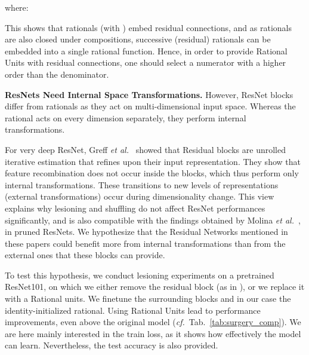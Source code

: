 \documentclass{article}
\newcommand{\cf}{\emph{cf.}~}
\newcommand{\etal}{\emph{et al.}~}
\begin{document}
where: 

This shows that rationals (with ) embed residual connections, and as rationals are also closed under compositions, successive (residual) rationals can be embedded into a single rational function. Hence, in order to provide Rational Units with residual connections,
one should select a numerator with a higher order than the denominator.

\textbf{ResNets Need Internal Space Transformations.}
However, ResNet blocks differ from rationals as they act on multi-dimensional input space. Whereas the rational acts on every dimension separately, they perform internal transformations. 

For very deep ResNet, Greff \etal{} showed that Residual blocks are unrolled iterative estimation that refines upon their input representation. They show that feature recombination does not occur inside the blocks, which thus perform only internal transformations. These transitions to new levels of representations (external transformations) occur during dimensionality change. This view explains why lesioning and shuffling do not affect ResNet performances significantly, and is also compatible with the findings obtained by Molina \etal{}, in pruned ResNets. We hypothesize that the Residual Networks mentioned in these papers could benefit more from internal transformations than from the external ones that these blocks can provide.

To test this hypothesis, we conduct lesioning experiments on a pretrained ResNet101, on which we either remove the residual block (as in \cite{VeitWB16}), or we replace it with a Rational units. 
We finetune the surrounding blocks and in our case the identity-initialized rational. Using Rational Units lead to performance improvements, even above the original model (\cf Tab.~\ref{tab:surgery_comp}). We are here mainly interested in the train loss, as it shows how effectively the model can learn. Nevertheless, the test accuracy is also provided.
\end{document}
